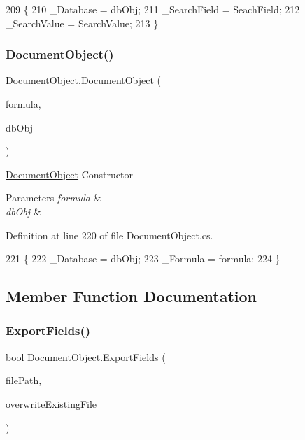 \begin{DoxyCode}
209     \{
210         \_Database = dbObj;
211         \_SearchField = SeachField;
212         \_SearchValue = SearchValue;
213     \}
\end{DoxyCode}
\mbox{\label{class_document_object_a4eb6c7aaa4774d1d5dbf5bf17dff23d9}} 
\subsubsection{\texorpdfstring{Document\+Object()}{DocumentObject()}\hspace{0.1cm}{\footnotesize\ttfamily [3/3]}}
{\footnotesize\ttfamily Document\+Object.\+Document\+Object (\begin{DoxyParamCaption}\item[{string}]{formula,  }\item[{\mbox{\hyperlink{class_database_object}{Database\+Object}}}]{db\+Obj }\end{DoxyParamCaption})}



\mbox{\hyperlink{class_document_object}{Document\+Object}} Constructor 


\begin{DoxyParams}{Parameters}
{\em formula} & \\
\hline
{\em db\+Obj} & \\
\hline
\end{DoxyParams}


Definition at line 220 of file Document\+Object.\+cs.


\begin{DoxyCode}
221     \{
222         \_Database = dbObj;
223         \_Formula = formula;
224     \}
\end{DoxyCode}


\subsection{Member Function Documentation}
\mbox{\label{class_document_object_a1a763aa01710b370634f46c89b7d2d8e}} 
\subsubsection{\texorpdfstring{Export\+Fields()}{ExportFields()}}
{\footnotesize\ttfamily bool Document\+Object.\+Export\+Fields (\begin{DoxyParamCaption}\item[{string}]{file\+Path,  }\item[{bool}]{overwrite\+Existing\+File }\end{DoxyParamCaption})}



